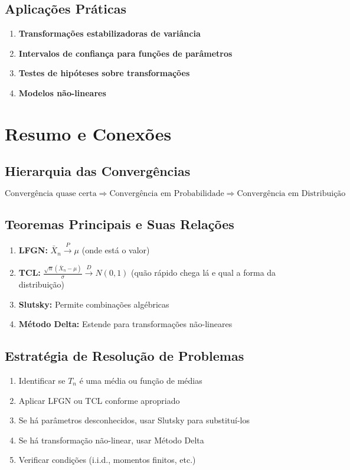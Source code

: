 \documentclass[12pt,a4paper]{article}
\theoremstyle{definition}
\theoremstyle{plain}
\begin{document}
\subsection{Aplicações Práticas}

\begin{enumerate}
    \item \textbf{Transformações estabilizadoras de variância}
    \item \textbf{Intervalos de confiança para funções de parâmetros}
    \item \textbf{Testes de hipóteses sobre transformações}
    \item \textbf{Modelos não-lineares}
\end{enumerate}

\section{Resumo e Conexões}

\subsection{Hierarquia das Convergências}

\[
\text{Convergência quase certa} \Rightarrow \text{Convergência em Probabilidade} \Rightarrow \text{Convergência em Distribuição}
\]

\subsection{Teoremas Principais e Suas Relações}

\begin{enumerate}
    \item \textbf{LFGN:} $\bar{X}_n \xrightarrow{P} \mu$ (onde está o valor)
    
    \item \textbf{TCL:} $\frac{\sqrt{n}(\bar{X}_n - \mu)}{\sigma} \xrightarrow{D} N(0,1)$ (quão rápido chega lá e qual a forma da distribuição)
    
    \item \textbf{Slutsky:} Permite combinações algébricas
    
    \item \textbf{Método Delta:} Estende para transformações não-lineares
\end{enumerate}

\subsection{Estratégia de Resolução de Problemas}

\begin{enumerate}
    \item Identificar se $T_n$ é uma média ou função de médias
    \item Aplicar LFGN ou TCL conforme apropriado
    \item Se há parâmetros desconhecidos, usar Slutsky para substituí-los
    \item Se há transformação não-linear, usar Método Delta
    \item Verificar condições (i.i.d., momentos finitos, etc.)
\end{enumerate}
\end{document}
